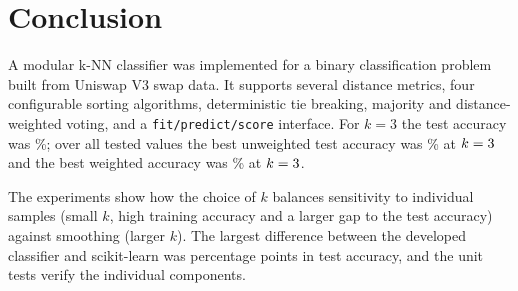 \documentclass[conference]{IEEEtran}
\begin{document}

\section{Conclusion}

A modular k-NN classifier was implemented for a binary classification problem built from Uniswap V3 swap data. It supports several distance metrics, four configurable sorting algorithms, deterministic tie breaking, majority and distance-weighted voting, and a \texttt{fit/predict/score} interface. For $k=3$ the test accuracy was \testAccThree\%; over all tested values the best unweighted test accuracy was \bestAccNormal\% at $k=3$ and the best weighted accuracy was \bestAccWeighted\% at $k=3$.

The experiments show how the choice of $k$ balances sensitivity to individual samples (small $k$, high training accuracy and a larger gap to the test accuracy) against smoothing (larger $k$). The largest difference between the developed classifier and scikit-learn was \maxDiffAll{} percentage points in test accuracy, and the unit tests verify the individual components.





\end{document}
